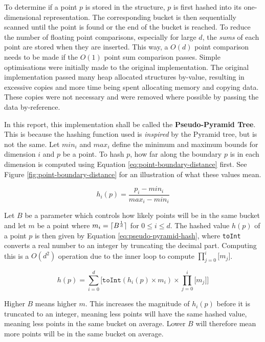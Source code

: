 To determine if a point $p$ is stored in the structure, $p$ is first hashed into its one-dimensional representation. The corresponding bucket is then sequentially scanned until the point is found or the end of the bucket is reached. To reduce the number of floating point comparisons, especially for large $d$, the \textit{sums} of each point are stored when they are inserted. This way, a $O(d)$ point comparison needs to be made if the $O(1)$ point sum comparison passes. Simple optimisations were initially made to the original implementation. The original implementation passed many heap allocated structures by-value, resulting in excessive copies and more time being spent allocating memory and copying data. These copies were not necessary and were removed where possible by passing the data by-reference.

In this report, this implementation shall be called the \textbf{Pseudo-Pyramid Tree}. This is because the hashing function used is \textit{inspired} by the Pyramid tree, but is not the same. Let $min_i$ and $max_i$ define the minimum and maximum bounds for dimension $i$ and $p$ be a point. To hash $p$, how far along the boundary $p$ is in each dimension is computed using Equation \ref{eq:point-boundary-distance} first. See Figure \ref{fig:point-boundary-distance} for an illustration of what these values mean.

\begin{equation}
	h_i(p) = \frac{p_i - min_i}{max_i - min_i}
	\label{eq:point-boundary-distance}
\end{equation}

Let $B$ be a parameter which controls how likely points will be in the same bucket and let $m$ be a point where $m_i = \lceil B^{\frac{1}{d}}\rceil$ for $0 \leq i \leq d$. The hashed value $h(p)$ of a point $p$ is then given by Equation \ref{eq:pseudo-pyramid-hash},  where \texttt{toInt} converts a real number to an integer by truncating the decimal part. Computing this is a $O(d^2)$ operation due to the inner loop to compute $\prod_{j=0}^{i}{\lbrack m_j \rbrack}$.

\begin{equation}
	h(p) = \sum_{i = 0}^{d} { \lbrack \texttt{toInt}( h_i(p) \times m_i ) \times \prod_{j=0}^{i}{\lbrack m_j \rbrack} \rbrack }
	\label{eq:pseudo-pyramid-hash}
\end{equation}

Higher $B$ means higher $m$. This increases the magnitude of $h_i(p)$ before it is truncated to an integer, meaning less points will have the same hashed value, meaning less points in the same bucket on average. Lower $B$ will therefore mean more points will be in the same bucket on average.

